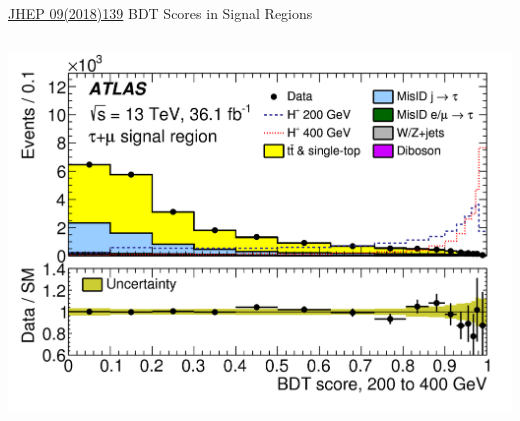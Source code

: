 \documentclass[aspectratio=169,xcolor=table]{beamer}
\begin{document}
\begin{frame}{\href{https://link.springer.com/article/10.1007/JHEP09(2018)139}{JHEP 09(2018)139} BDT Scores in Signal Regions}
\begin{columns}
        \includegraphics[height=.24\textheight,keepaspectratio=true]{taumu_SR_2018/taumu_SR_200to400_2018.png}



\end{columns}
\end{frame}
\end{document}

